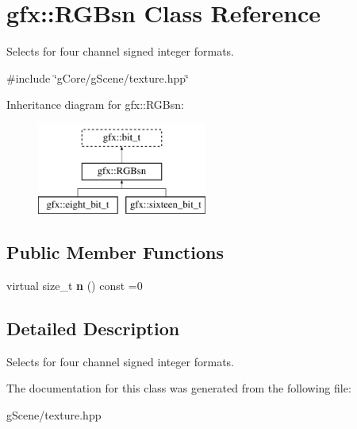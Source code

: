\hypertarget{classgfx_1_1RGBsn}{\section{gfx\-:\-:R\-G\-Bsn Class Reference}
\label{classgfx_1_1RGBsn}
}


Selects for four channel signed integer formats.  




{\ttfamily \#include \char`\"{}g\-Core/g\-Scene/texture.\-hpp\char`\"{}}

Inheritance diagram for gfx\-:\-:R\-G\-Bsn\-:\begin{figure}[H]
\begin{center}
\leavevmode
\includegraphics[height=3.000000cm]{classgfx_1_1RGBsn}
\end{center}
\end{figure}
\subsection*{Public Member Functions}
\begin{DoxyCompactItemize}
\item 
\hypertarget{classgfx_1_1RGBsn_aca578d4da90ea5d67f9ac05bee2d7a93}{virtual size\-\_\-t {\bfseries n} () const =0}\label{classgfx_1_1RGBsn_aca578d4da90ea5d67f9ac05bee2d7a93}

\end{DoxyCompactItemize}


\subsection{Detailed Description}
Selects for four channel signed integer formats. 

The documentation for this class was generated from the following file\-:\begin{DoxyCompactItemize}
\item 
g\-Scene/texture.\-hpp\end{DoxyCompactItemize}
